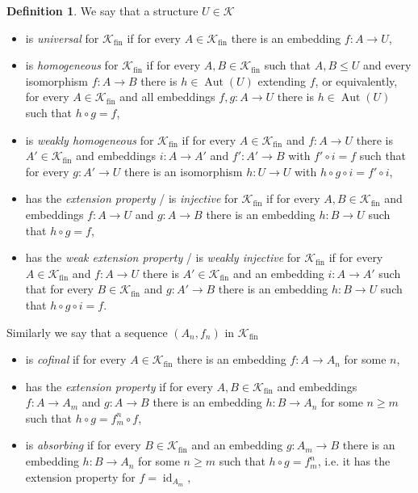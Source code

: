 \documentclass[oneside,notitlepage,12pt]{article}
\theoremstyle{definition}
\newtheorem{df}[tw]{Definition}
\theoremstyle{remark}
\newcommand \maps {\colon} %
\newcommand \id [1]{{\operatorname{id}_{#1}}}
\newcommand \cmp {\circ} %
\newcommand \K {\mathscr{K}}
\newcommand \fin {{\operatorname{fin}}}
\newcommand \Aut {\operatorname{Aut}}
\begin{document}
\begin{df} \label{def:Fraisse}
We say that a structure $U \in \K$ 
\begin{itemize}
    \item is \emph{universal} for $\K_\fin$  if for every $A \in \K_\fin$ there is an embedding $f\maps A \to U$,
    
    \item is \emph{homogeneous} for $\K_\fin$ if for every $A, B \in \K_\fin$ such that $A, B \leq U$ and every isomorphism $f\maps A \to B$ there is $h \in \Aut(U)$ extending $f$, or equivalently, for every $A \in \K_\fin$ and all embeddings $f, g\maps A \to U$ there is $h \in \Aut(U)$ such that $h \cmp g  = f$,
    
    \item is \emph{weakly homogeneous} for $\K_\fin$ if for every $A \in \K_\fin$ and $f\maps A \to U$ there is $A' \in \K_\fin$ and embeddings $i\maps A \to A'$ and $f'\maps A' \to B$ with $f' \cmp i = f$ such that for every $g\maps A' \to U$ there is an isomorphism $h\maps U \to U$ with $h \cmp g \cmp i = f' \cmp i$,
    
    \item has the \emph{extension property} / is \emph{injective} for $\K_\fin$ if for every $A, B \in \K_\fin$ and embeddings $f\maps A \to U$ and $g\maps A \to B$ there is an embedding $h\maps B \to U$ such that $h \cmp g = f$,
    
    \item has the \emph{weak extension property} / is \emph{weakly injective} for $\K_\fin$ if for every $A \in \K_\fin$ and $f\maps A \to U$ there is $A' \in \K_\fin$ and an embedding $i\maps A \to A'$ such that for every $B \in \K_\fin$ and $g\maps A' \to B$ there is an embedding $h\maps B \to U$ such that $h \cmp g \cmp i = f$.
\end{itemize}
Similarly we say that a sequence $(A_n, f_n)$ in $\K_\fin$ 
\begin{itemize}
    \item is \emph{cofinal} if for every $A \in \K_\fin$ there is an embedding $f\maps A \to A_n$ for some $n$,
    
    \item has the \emph{extension property} if for every $A, B \in \K_\fin$ and embeddings $f\maps A \to A_m$ and $g\maps A \to B$ there is an embedding $h\maps B \to A_n$ for some $n \geq m$ such that $h \cmp g = f^n_m \cmp f$,
    
    \item is \emph{absorbing} if for every $B \in \K_\fin$ and an embedding $g\maps A_m \to B$ there is an embedding $h\maps B \to A_n$ for some $n \geq m$ such that $h \cmp g = f^n_m$, i.e. it has the extension property for $f = \id{A_m}$,


\end{itemize}
\end{df}
\end{document}
